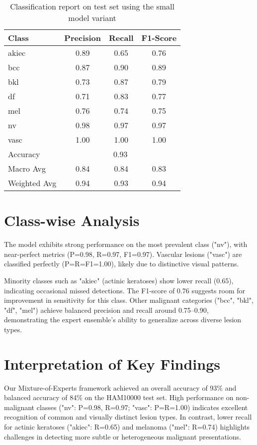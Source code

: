 \begin{itemize}
\begin{table}[h!]
  \centering
  \caption{Classification report on test set using the small model variant}
  \label{tab:classification-report}
  \begin{tabular}{lccc}
    \hline
    Class & Precision & Recall & F1-Score \\
    \hline
    akiec  & 0.89 & 0.65 & 0.76 \\
    bcc    & 0.87 & 0.90 & 0.89 \\
    bkl    & 0.73 & 0.87 & 0.79 \\
    df     & 0.71 & 0.83 & 0.77 \\
    mel    & 0.76 & 0.74 & 0.75 \\
    nv     & 0.98 & 0.97 & 0.97 \\
    vasc   & 1.00 & 1.00 & 1.00 \\
    \hline
    Accuracy      & \multicolumn{3}{c}{0.93} \\
    Macro Avg     & 0.84 & 0.84 & 0.83 \\
    Weighted Avg  & 0.94 & 0.93 & 0.94 \\
    \hline
  \end{tabular}
\end{table}



\section{Class-wise Analysis}
The model exhibits strong performance on the most prevalent class ("nv"), with near-perfect metrics (P=0.98, R=0.97, F1=0.97). Vascular lesions ("vasc") are classified perfectly (P=R=F1=1.00), likely due to distinctive visual patterns.

Minority classes such as "akiec" (actinic keratoses) show lower recall (0.65), indicating occasional missed detections. The F1-score of 0.76 suggests room for improvement in sensitivity for this class. Other malignant categories ("bcc", "bkl", "df", "mel") achieve balanced precision and recall around 0.75--0.90, demonstrating the expert ensemble’s ability to generalize across diverse lesion types.

\section{Interpretation of Key Findings}
Our Mixture-of-Experts framework achieved an overall accuracy of 93\% and balanced accuracy of 84\% on the HAM10000 test set. High performance on non-malignant classes ("nv": P=0.98, R=0.97; "vasc": P=R=1.00) indicates excellent recognition of common and visually distinct lesion types. In contrast, lower recall for actinic keratoses ("akiec": R=0.65) and melanoma ("mel": R=0.74) highlights challenges in detecting more subtle or heterogeneous malignant presentations.


\end{itemize}
